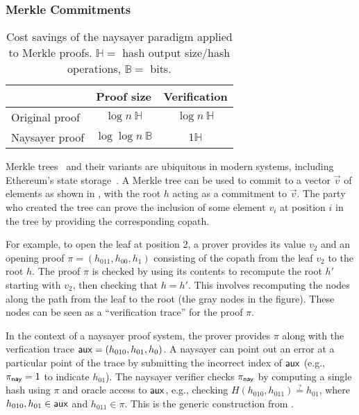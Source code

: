 \subsubsection{Merkle Commitments}\label{sec:merkle_naysayer}


\begin{table}[h]
   \centering
    \setlength{\belowbottomsep}{6pt}
    \begin{tabular}{l c c} 
    \toprule
     & \textbf{Proof size}
     & \textbf{Verification}
     \\ \midrule
     Original proof
     & $\log{n}\ \mathbb{H}$
     & $\log{n}\ \mathbb{H}$
     \\\midrule
     Naysayer proof
     & $\log\log{n}\ \mathbb{B}$
     & $1\mathbb{H}$
    \\ \bottomrule
    \end{tabular}
    \caption{Cost savings of the naysayer paradigm applied to Merkle proofs. $\mathbb{H} =$ hash output size/hash operations, $\mathbb{B} =$ bits.}
    \label{tab:merkle_asym}
   \end{table}

Merkle trees~\cite{C:Merkle87} and their variants are ubiquitous in modern systems, including Ethereum's state storage~\cite{ethereum_trie}. A Merkle tree can be used to commit to a vector $\vec{v}$ of elements as shown in , with the root $h$ acting as a commitment to $\vec{v}$. The party who created the tree can prove the inclusion of some element $v_i$ at position $i$ in the tree by providing the corresponding copath. 

For example, to open the leaf at position 2, a prover provides its value $v_2$ and an opening proof $\pi = (h_{011}, h_{00}, h_{1})$ consisting of the copath from the leaf $v_2$ to the root $h$. The proof $\pi$ is checked by using its contents to recompute the root $h'$ starting with $v_2$, then checking that $h = h'$. This involves recomputing the nodes along the path from the leaf to the root (the gray nodes in the figure). These nodes can be seen as a ``verification trace'' for the proof $\pi$.
    
In the context of a naysayer proof system, the prover provides $\pi$ along with the verfication trace $\mathsf{aux} = (h_{010}, h_{01}, h_{0})$. A naysayer can point out an error at a particular point of the trace by submitting the incorrect index of $\mathsf{aux}$ (e.g., $\pi_{\mathsf{nay}} = 1$ to indicate $h_{01}$). The naysayer verifier checks $\pi_{\mathsf{nay}}$ by computing a single hash using $\pi$ and oracle access to $\mathsf{aux}$, e.g., checking $H(h_{010}, h_{011}) \stackrel{?}{=} h_{01}$, where $h_{010}, h_{01} \in \mathsf{aux}$ and $h_{011} \in \pi$. This is the generic construction from .

